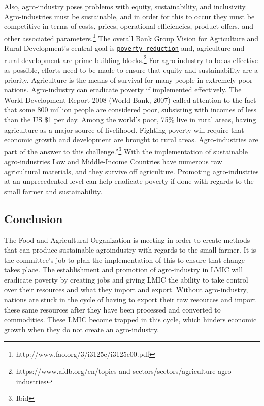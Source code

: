 \documentclass[10pt, letterpaper]{article}
\begin{document}
Also, agro-industry poses problems with equity, sustainability, and
inclusivity. Agro-industries must be sustainable, and in order for this
to occur they must be competitive in terms of costs, prices, operational
efficiencies, product offers, and other associated
parameters.\footnote{http://www.fao.org/3/i3125e/i3125e00.pdf} The
overall Bank Group Vision for Agriculture and Rural Development's
central goal is 
\texttt{\href{https://www.afdb.org/en/topics-and-sectors/topics/poverty-reduction/}{poverty
reduction}} and, agriculture and rural development are prime building
blocks.\footnote{https://www.afdb.org/en/topics-and-sectors/sectors/agriculture-agro-industries}
For agro-industry to be as effective as possible, efforts need to be
made to ensure that equity and sustainability are a priority.
Agriculture is the means of survival for many people in extremely poor
nations. Agro-industry can eradicate poverty if implemented effectively.
The World Development Report 2008 (World Bank, 2007) called attention to
the fact that some 800 million people are considered poor, subsisting
with incomes of less than the US \$1 per day. Among the world's poor,
75\% live in rural areas, having agriculture as a major source of
livelihood. Fighting poverty will require that economic growth and
development are brought to rural areas. Agro-industries are part of the
answer to this challenge.''\footnote{Ibid} With the implementation of
sustainable agro-industries Low and Middle-Income Countries have
numerous raw agricultural materials, and they survive off agriculture.
Promoting agro-industries at an unprecedented level can help eradicate
poverty if done with regards to the small farmer and sustainability. \\

\subsection{Conclusion}

The Food and Agricultural Organization is meeting in order to create
methods that can produce sustainable agroindustry with regards to the
small farmer. It is the committee's job to plan the implementation of
this to ensure that change takes place. The establishment and promotion
of agro-industry in LMIC will eradicate poverty by creating jobs and
giving LMIC the ability to take control over their resources and what
they import and export. Without agro-industry, nations are stuck in the
cycle of having to export their raw resources and import these same
resources after they have been processed and converted to commodities.
These LMIC become trapped in this cycle, which hinders economic growth
when they do not create an agro-industry. \\
\end{document}
